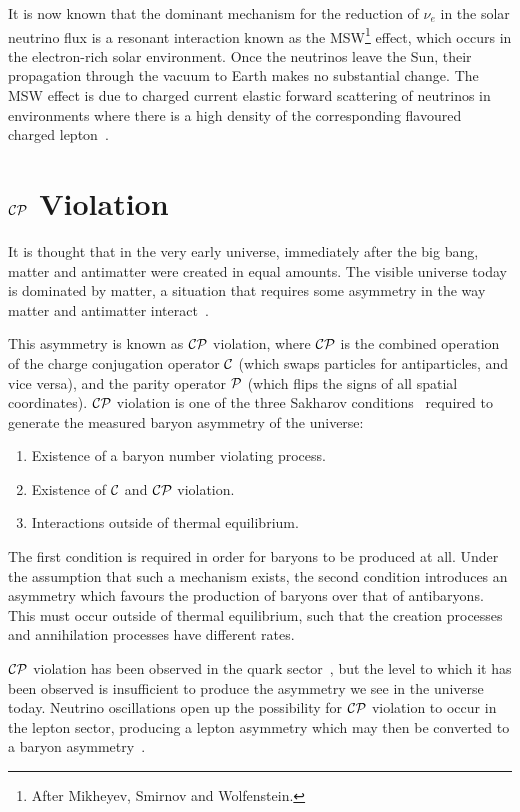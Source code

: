 It is now known that the dominant mechanism for the reduction of $\nu_e$ in the solar neutrino flux is a resonant interaction known as the MSW\footnote{After Mikheyev, Smirnov and Wolfenstein.} effect, which occurs in the electron-rich solar environment. Once the neutrinos leave the Sun, their propagation through the vacuum to Earth makes no substantial change. The MSW effect is due to charged current elastic forward scattering of neutrinos in environments where there is a high density of the corresponding flavoured charged lepton~\citep{Zuber2004}.

\section{\texorpdfstring{$\mathcal{C}\mathcal{P}$}{CP} Violation}
It is thought that in the very early universe, immediately after the big bang, matter and antimatter were created in equal amounts. The visible universe today is dominated by matter, a situation that requires some asymmetry in the way matter and antimatter interact~\citep{Perkins2000}.

This asymmetry is known as $\mathcal{C}\mathcal{P}$ violation, where $\mathcal{C}\mathcal{P}$ is the combined operation of the charge conjugation operator $\mathcal{C}$ (which swaps particles for antiparticles, and vice versa), and the parity operator $\mathcal{P}$ (which flips the signs of all spatial coordinates). $\mathcal{C}\mathcal{P}$ violation is one of the three Sakharov conditions~\citep{Sakharov1967} required to generate the measured baryon asymmetry of the universe:
\begin{enumerate}
    \item Existence of a baryon number violating process.
    \item Existence of $\mathcal{C}$ and $\mathcal{C}\mathcal{P}$ violation.
    \item Interactions outside of thermal equilibrium.
\end{enumerate}

The first condition is required in order for baryons to be produced at all. Under the assumption that such a mechanism exists, the second condition introduces an asymmetry which favours the production of baryons over that of antibaryons. This must occur outside of thermal equilibrium, such that the creation processes and annihilation processes have different rates.

$\mathcal{C}\mathcal{P}$ violation has been observed in the quark sector~\citep{PDG2012}, but the level to which it has been observed is insufficient to produce the asymmetry we see in the universe today. Neutrino oscillations open up the possibility for $\mathcal{C}\mathcal{P}$ violation to occur in the lepton sector, producing a lepton asymmetry which may then be converted to a baryon asymmetry~\citep{Riotto1999}.

